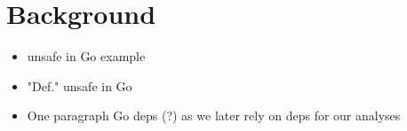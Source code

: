 \section{Background}
\label{sec:background}



\begin{itemize}
    \item unsafe in Go example 
    \item "Def." unsafe in Go  
    \item One paragraph Go deps (?) as we later rely on deps for our analyses
\end{itemize}